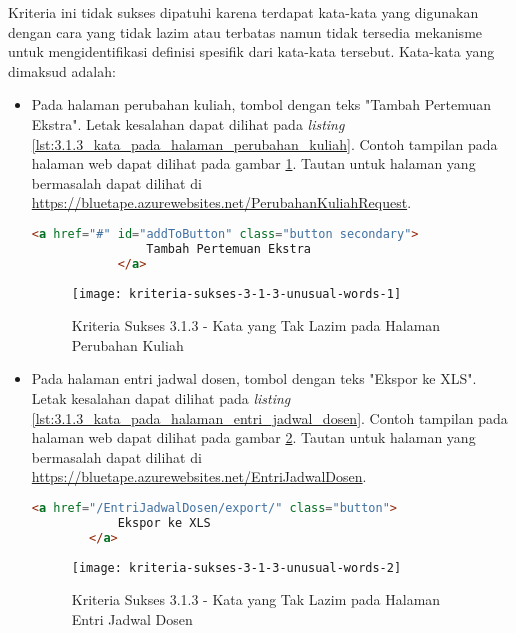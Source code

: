 Kriteria ini tidak sukses dipatuhi karena terdapat kata-kata yang digunakan dengan cara yang tidak lazim atau terbatas namun tidak tersedia mekanisme untuk mengidentifikasi definisi spesifik dari kata-kata tersebut. Kata-kata yang dimaksud adalah:

\begin{itemize}
    \item Pada halaman perubahan kuliah, tombol dengan teks "Tambah Pertemuan Ekstra". Letak kesalahan dapat dilihat pada \textit{listing} \ref{lst:3.1.3_kata_pada_halaman_perubahan_kuliah}. Contoh tampilan pada halaman web dapat dilihat pada gambar \ref{fig:3.1.3_unusual_words_1}. Tautan untuk halaman yang bermasalah dapat dilihat di \url{https://bluetape.azurewebsites.net/PerubahanKuliahRequest}.
    \begin{lstlisting}[frame=single, label={lst:3.1.3_kata_pada_halaman_perubahan_kuliah}, language=HTML, caption=Kriteria Sukses 3.1.3 - Kata yang Tak Lazim pada Halaman Perubahan Kuliah]
            <a href="#" id="addToButton" class="button secondary">
                Tambah Pertemuan Ekstra
            </a>
    \end{lstlisting}
    
    \begin{figure}[H]
        \centering  
        \texttt{[image: kriteria-sukses-3-1-3-unusual-words-1]}  
        \caption[Kriteria Sukses 3.1.3 - Kata yang Tak Lazim pada Halaman Perubahan Kuliah]{Kriteria Sukses 3.1.3 - Kata yang Tak Lazim pada Halaman Perubahan Kuliah}
        \label{fig:3.1.3_unusual_words_1}  
    \end{figure}
    
    \item Pada halaman entri jadwal dosen, tombol dengan teks "Ekspor ke XLS". Letak kesalahan dapat dilihat pada \textit{listing} \ref{lst:3.1.3_kata_pada_halaman_entri_jadwal_dosen}. Contoh tampilan pada halaman web dapat dilihat pada gambar \ref{fig:3.1.3_unusual_words_2}. Tautan untuk halaman yang bermasalah dapat dilihat di \url{https://bluetape.azurewebsites.net/EntriJadwalDosen}.
    \begin{lstlisting}[frame=single, label={lst:3.1.3_kata_pada_halaman_entri_jadwal_dosen}, language=HTML, caption=Kriteria Sukses 3.1.3 - Kata yang Tak Lazim pada Halaman Entri Jadwal Dosen]
        <a href="/EntriJadwalDosen/export/" class="button">
            Ekspor ke XLS
        </a>
    \end{lstlisting}
    
    \begin{figure}[H]
        \centering  
        \texttt{[image: kriteria-sukses-3-1-3-unusual-words-2]}  
        \caption[Kriteria Sukses 3.1.3 - Kata yang Tak Lazim pada Halaman Entri Jadwal Dosen]{Kriteria Sukses 3.1.3 - Kata yang Tak Lazim pada Halaman Entri Jadwal Dosen}
        \label{fig:3.1.3_unusual_words_2}  
    \end{figure}


\end{itemize}
